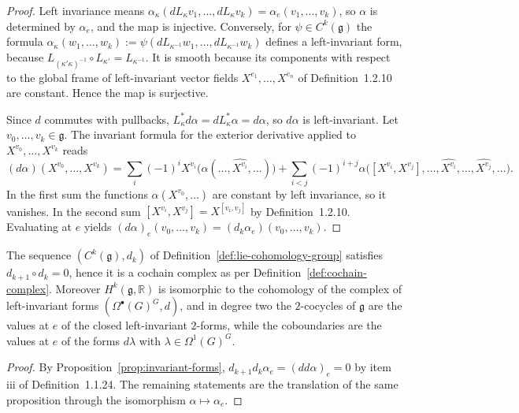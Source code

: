 \begin{proof}
	Left invariance means $\alpha_\kappa(dL_\kappa v_1,\dots,dL_\kappa v_k)=\alpha_e(v_1,\dots,v_k)$, so $\alpha$ is determined by $\alpha_e$, and the map is injective. Conversely, for $\psi\in C^k(\mathfrak{g})$ the formula $\alpha_\kappa(w_1,\dots,w_k):=\psi(dL_{\kappa^{-1}}w_1,\dots,dL_{\kappa^{-1}}w_k)$ defines a left-invariant form, because $L_{(\kappa'\kappa)^{-1}}\circ L_{\kappa'}=L_{\kappa^{-1}}$. It is smooth because its components with respect to the global frame of left-invariant vector fields $X^{e_1},\dots,X^{e_n}$ of Definition~1.2.10 are constant. Hence the map is surjective.
	
	Since $d$ commutes with pullbacks, $L_\kappa^*d\alpha=dL_\kappa^*\alpha=d\alpha$, so $d\alpha$ is left-invariant. Let $v_0,\dots,v_k\in\mathfrak{g}$. The invariant formula for the exterior derivative \cite[TODO-location]{TODO-Lee13} applied to $X^{v_0},\dots,X^{v_k}$ reads
	\begin{equation*}
		(d\alpha)(X^{v_0},\dots,X^{v_k})=\sum_i(-1)^iX^{v_i}\big(\alpha(\dots,\widehat{X^{v_i}},\dots)\big)+\sum_{i<j}(-1)^{i+j}\alpha\big([X^{v_i},X^{v_j}],\dots,\widehat{X^{v_i}},\dots,\widehat{X^{v_j}},\dots\big).
	\end{equation*}
	In the first sum the functions $\alpha(X^{v_0},\dots)$ are constant by left invariance, so it vanishes. In the second sum $[X^{v_i},X^{v_j}]=X^{[v_i,v_j]}$ by Definition~1.2.10. Evaluating at $e$ yields $(d\alpha)_e(v_0,\dots,v_k)=(d_k\alpha_e)(v_0,\dots,v_k)$.
\end{proof}

\begin{corollary}\label{cor:lie-complex}
	The sequence $(C^k(\mathfrak{g}),d_k)$ of Definition~\ref{def:lie-cohomology-group} satisfies $d_{k+1}\circ d_k=0$, hence it is a cochain complex as per Definition~\ref{def:cochain-complex}. Moreover $H^k(\mathfrak{g},\mathbb{R})$ is isomorphic to the cohomology of the complex of left-invariant forms $(\Omega^\bullet(G)^G,d)$, and in degree two the $2$-cocycles of $\mathfrak{g}$ are the values at $e$ of the closed left-invariant $2$-forms, while the coboundaries are the values at $e$ of the forms $d\lambda$ with $\lambda\in\Omega^1(G)^G$.
\end{corollary}

\begin{proof}
	By Proposition~\ref{prop:invariant-forms}, $d_{k+1}d_k\alpha_e=(dd\alpha)_e=0$ by item iii of Definition~1.1.24. The remaining statements are the translation of the same proposition through the isomorphism $\alpha\mapsto\alpha_e$.
\end{proof}

